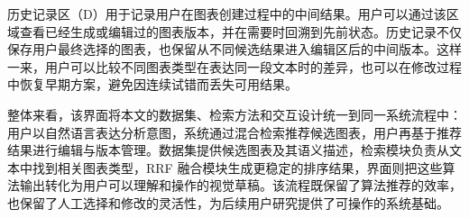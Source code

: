 历史记录区（D）用于记录用户在图表创建过程中的中间结果。用户可以通过该区域查看已经生成或编辑过的图表版本，并在需要时回溯到先前状态。历史记录不仅保存用户最终选择的图表，也保留从不同候选结果进入编辑区后的中间版本。这样一来，用户可以比较不同图表类型在表达同一段文本时的差异，也可以在修改过程中恢复早期方案，避免因连续试错而丢失可用结果。


整体来看，该界面将本文的数据集、检索方法和交互设计统一到同一系统流程中：用户以自然语言表达分析意图，系统通过混合检索推荐候选图表，用户再基于推荐结果进行编辑与版本管理。数据集提供候选图表及其语义描述，检索模块负责从文本中找到相关图表类型，RRF 融合模块生成更稳定的排序结果，界面则把这些算法输出转化为用户可以理解和操作的视觉草稿。该流程既保留了算法推荐的效率，也保留了人工选择和修改的灵活性，为后续用户研究提供了可操作的系统基础。

\newpage



